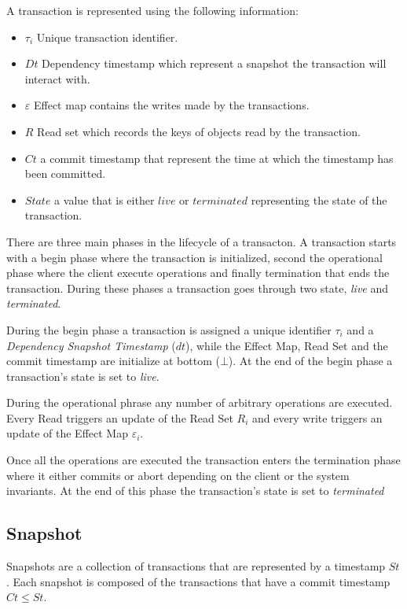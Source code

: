 \documentclass[systeme]{compas2022}
\begin{document}
A transaction is represented using the following information:
\begin{itemize}
\item $\tau_i$ Unique transaction identifier.
\item $Dt$ Dependency timestamp which represent a snapshot the transaction will interact with.
\item $\varepsilon$ Effect map contains the writes made by the transactions.
\item $R$ Read set which records the keys of objects read by the transaction.
\item $Ct$ a commit timestamp that represent the time at which the timestamp has been committed.
\item $State$ a value that is either $live$ or $terminated$ representing the state of the transaction.\\
\end{itemize}

There are three main phases in the lifecycle of a transacton.
A transaction starts with a begin phase where the transaction is initialized, second the operational phase where the client execute operations and finally termination that ends the transaction.
During these phases a transaction goes through two state, \emph{live} and \emph{terminated}.

During the begin phase a transaction is assigned a unique identifier $\tau_i$ and a \emph{Dependency Snapshot Timestamp} ($dt$), while the Effect Map, Read Set and the commit timestamp are initialize at bottom ($\bot$).
At the end of the begin phase a transaction's state is set to \emph{live}.

During the operational phrase any number of arbitrary operations are executed.
Every Read triggers an update of the Read Set $R_i$ and every write triggers an update of the Effect Map $\varepsilon_i$.

Once all the operations are executed the transaction enters the termination phase where it either commits or abort depending on the client or the system invariants. 
At the end of this phase the transaction's state is set to \emph{terminated}

\subsection{Snapshot}

Snapshots are a collection of transactions that are represented by a timestamp $St$.
Each snapshot is composed of the transactions that have a commit timestamp $Ct \leq St$. 
\end{document}
